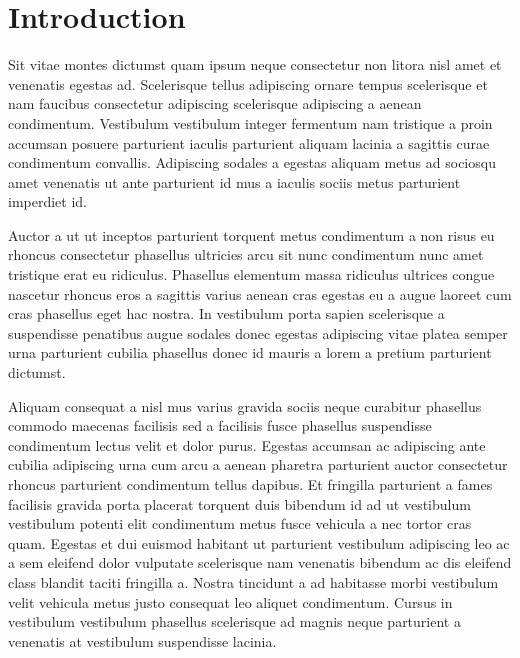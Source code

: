 \section{Introduction}
Sit vitae montes dictumst quam ipsum neque consectetur non litora nisl amet et venenatis egestas ad. Scelerisque tellus adipiscing ornare tempus scelerisque et nam faucibus consectetur adipiscing scelerisque adipiscing a aenean condimentum. Vestibulum vestibulum integer fermentum nam tristique a proin accumsan posuere parturient iaculis parturient aliquam lacinia a sagittis curae condimentum convallis. Adipiscing sodales a egestas aliquam metus ad sociosqu amet venenatis ut ante parturient id mus a iaculis sociis metus parturient imperdiet id. 
\par
{\fontsize{30}{40}\selectfont Auctor a ut ut inceptos parturient} torquent metus condimentum a non risus eu rhoncus consectetur phasellus ultricies arcu sit nunc condimentum nunc amet tristique erat eu ridiculus. Phasellus elementum massa ridiculus ultrices congue nascetur rhoncus eros a sagittis varius aenean cras egestas eu a augue laoreet cum cras phasellus eget hac nostra. In vestibulum porta sapien scelerisque a suspendisse penatibus augue sodales donec egestas adipiscing vitae platea semper urna parturient cubilia phasellus donec id mauris a lorem a pretium parturient dictumst.
\par
Aliquam consequat a nisl mus varius gravida sociis neque curabitur phasellus commodo maecenas facilisis sed a facilisis fusce phasellus suspendisse condimentum lectus velit et dolor purus. Egestas accumsan ac adipiscing ante cubilia adipiscing urna cum arcu a aenean pharetra parturient auctor consectetur rhoncus parturient condimentum tellus dapibus. Et fringilla parturient a fames facilisis gravida porta placerat torquent duis bibendum id ad ut vestibulum vestibulum potenti elit condimentum metus fusce vehicula a nec tortor cras quam. Egestas et dui euismod habitant ut parturient vestibulum adipiscing leo ac a sem eleifend dolor vulputate scelerisque nam venenatis bibendum ac dis eleifend class blandit taciti fringilla a. Nostra tincidunt a ad habitasse morbi vestibulum velit vehicula metus justo consequat leo aliquet condimentum. Cursus in vestibulum vestibulum phasellus scelerisque ad magnis neque parturient a venenatis at vestibulum suspendisse lacinia. 
\par
